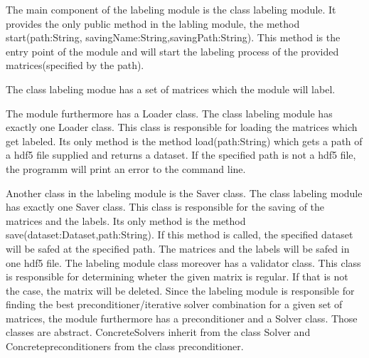 \documentclass[parskip=full]{scrartcl}
\begin{document}
\newpage
\begin{figure}[h]
\begin{center}

\label{Labeling Module}
\end{center}
\end{figure}
\newpage

The main component of the labeling module is the class labeling module. It provides the only public method in the labling module, the method start(path:String, savingName:String,savingPath:String). This method is the entry point of the module and will start the labeling process of the provided matrices(specified by the path). \newline\newline

The class labeling modue has a set of matrices which the module will label.\newline\newline

The module furthermore has a Loader class. The class labeling module has exactly one Loader class. This class is responsible for loading the matrices which get labeled. Its only method is the method load(path:String) which gets a path of a hdf5 file supplied and returns a dataset. If the specified path is not a hdf5 file, the programm will print an error to the command line. \newline\newline

Another class in the labeling module is the Saver class. The class labeling module has exactly one Saver class. This class is responsible for the saving of the matrices and the \glspl{label}. Its only method is the method save(dataset:Dataset,path:String). If this method is called, the specified dataset will be safed at the specified path. The matrices and the \glspl{label} will be safed in one hdf5 file.\newline
\newline
The labeling module class moreover has a validator class. This class is responsible for determining wheter the given matrix is regular. If that is not the case, the matrix will be deleted.
\newline\newline
Since the labeling module is responsible for finding the best \gls{preconditioner}/\gls{iterative solver} combination for a given set of matrices, the module furthermore has a \gls{preconditioner} and a Solver class. Those classes are abstract. ConcreteSolvers inherit from the class Solver and Concrete\gls{preconditioner}s from the class \gls{preconditioner}.\newline\newline
\end{document}
